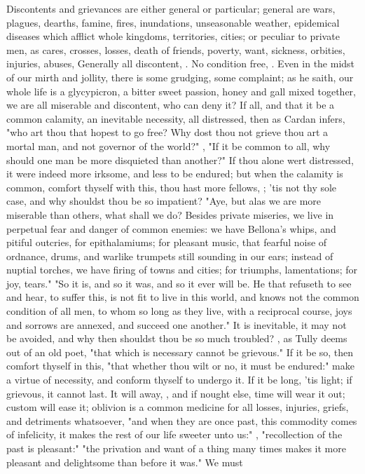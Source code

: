 {Discontents and grievances are either general or particular; general are wars, plagues, dearths, famine, fires, inundations, unseasonable weather, epidemical diseases which afflict whole kingdoms, territories, cities; or peculiar to private men, as cares, crosses, losses, death of friends, poverty, want, sickness, orbities, injuries, abuses, \etc{} Generally all discontent, . No condition free, . Even in the midst of our mirth and jollity, there is some grudging, some complaint; as he saith, our whole life is a glycypicron, a bitter sweet passion, honey and gall mixed together, we are all miserable and discontent, who can deny it? If all, and that it be a common calamity, an inevitable necessity, all distressed, then as Cardan infers, "who art thou that hopest to go free? Why dost thou not grieve thou art a mortal man, and not governor of the world?" , "If it be common to all, why should one man be more disquieted than another?" If thou alone wert distressed, it were indeed more irksome, and less to be endured; but when the calamity is common, comfort thyself with this, thou hast more fellows, ; 'tis not thy sole case, and why shouldst thou be so impatient? "Aye, but alas we are more miserable than others, what shall we do? Besides private miseries, we live in perpetual fear and danger of common enemies: we have Bellona's whips, and pitiful outcries, for epithalamiums; for pleasant music, that fearful noise of ordnance, drums, and warlike trumpets still sounding in our ears; instead of nuptial torches, we have firing of towns and cities; for triumphs, lamentations; for joy, tears." "So it is, and so it was, and so it ever will be. He that refuseth to see and hear, to suffer this, is not fit to live in this world, and knows not the common condition of all men, to whom so long as they live, with a reciprocal course, joys and sorrows are annexed, and succeed one another." It is inevitable, it may not be avoided, and why then shouldst thou be so much troubled? , as Tully deems out of an old poet, "that which is necessary cannot be grievous." If it be so, then comfort thyself in this, "that whether thou wilt or no, it must be endured:" make a virtue of necessity, and conform thyself to undergo it.  If it be long, 'tis light; if grievous, it cannot last. It will away, , and if nought else, time will wear it out; custom will ease it; oblivion is a common medicine for all losses, injuries, griefs, and detriments whatsoever, "and when they are once past, this commodity comes of infelicity, it makes the rest of our life sweeter unto us:" , "recollection of the past is pleasant:" "the privation and want of a thing many times makes it more pleasant and delightsome than before it was." We must }
